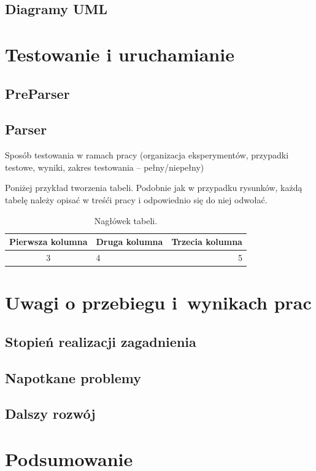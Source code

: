 \documentclass[a4paper]{book}
\begin{document}
\section{Diagramy UML}
\chapter{Testowanie i uruchamianie}
\section {PreParser}
\section {Parser}
Sposób testowania w ramach pracy (organizacja eksperymentów, przypadki testowe, wyniki, zakres testowania -- pełny/niepełny)

Poniżej przykład tworzenia tabeli. Podobnie jak w przypadku rysunków, każdą tabelę należy opisać w treśći pracy i odpowiednio się do niej odwołać.

\begin{table}
	\centering
	\caption{Nagłówek tabeli.}
	\begin{tabular}{|c|l|r|}
		\hline
		Pierwsza kolumna & Druga kolumna & Trzecia kolumna \\
		\hline
		3 & 4 & 5 \\
		\hline 
	\end{tabular}
	\label{tab:przyklad_tabeli}
\end{table}

\chapter{Uwagi o przebiegu i~wynikach prac}
\section {Stopień realizacji zagadnienia}
\section{Napotkane problemy}
\section{Dalszy rozwój}

\chapter{Podsumowanie}
\end{document}

